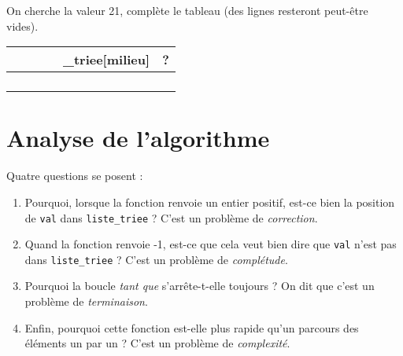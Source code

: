 \begin{exercice}
	On cherche la valeur 21, complète le tableau (des lignes resteront peut-être vides).
	\begin{center}
		\tabularstyled
		\begin{tabular}{|c|c|c|c|c|c|}
			\hline
			\rowcolor{UGLiOrange}{\thsn°itér} & {\thsgauche} & {\thsdroite} & {\thsmilieu} & {\thsliste\_triee[milieu]} & {\thsreturn ?} \\
			\hline
			                                                   &                               &                               &                               &                                             &                                 \\
			\hline
			                                                   &                               &                               &                               &                                             &                                 \\
			\hline
			                                                   &                               &                               &                               &                                             &                                 \\
			\hline
			                                                   &                               &                               &                               &                                             &                                 \\
			\hline
		\end{tabular}
	\end{center}
\end{exercice}
\section{Analyse de l'algorithme}

Quatre questions se posent :

\begin{enumerate}
	\item 	Pourquoi, lorsque la fonction renvoie un entier positif, est-ce bien la position de \texttt{val} dans \texttt{liste_triee} ?
	      C'est un problème de \textit{correction}.
	\item 	Quand la fonction renvoie -1, est-ce que cela veut bien dire que \texttt{val} n'est pas dans \texttt{liste_triee} ?
	      C'est un problème de \textit{complétude}.
	\item 	Pourquoi la boucle \textit{tant que} s'arrête-t-elle toujours ? On dit que c'est un problème de \textit{terminaison}.
	\item	Enfin, pourquoi cette fonction est-elle plus rapide qu'un parcours des éléments un par un ?
	      C'est un problème de \textit{complexité}.
\end{enumerate}


